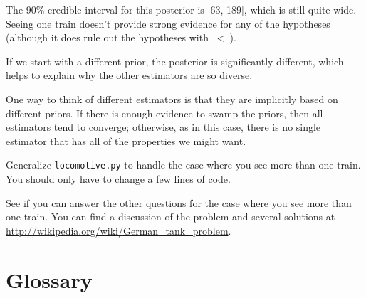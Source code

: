 \documentclass[12pt]{book}
\begin{document}
The 90\% credible interval for this posterior is [63, 189], which
is still quite wide.  Seeing one train doesn't provide strong evidence
for any of the hypotheses (although it does rule out the hypotheses
with \n~<~\ii).

If we start with a different prior, the posterior is significantly
different, which helps to explain why the other estimators are so
diverse.

One way to think of different estimators is that they are implicitly
based on different priors.  If there is enough evidence to swamp the
priors, then all estimators tend to converge; otherwise, as in this
case, there is no single estimator that has all of the properties we
might want.

\begin{exercise}
Generalize \verb"locomotive.py" to handle the case where you
see more than one train.  You should only have to
change a few lines of code.

See if you can answer the other questions for the case where you
see more than one train.  You can find a discussion of the problem
and several solutions at
\url{http://wikipedia.org/wiki/German_tank_problem}.

\end{exercise}

\section{Glossary}
\end{document}
